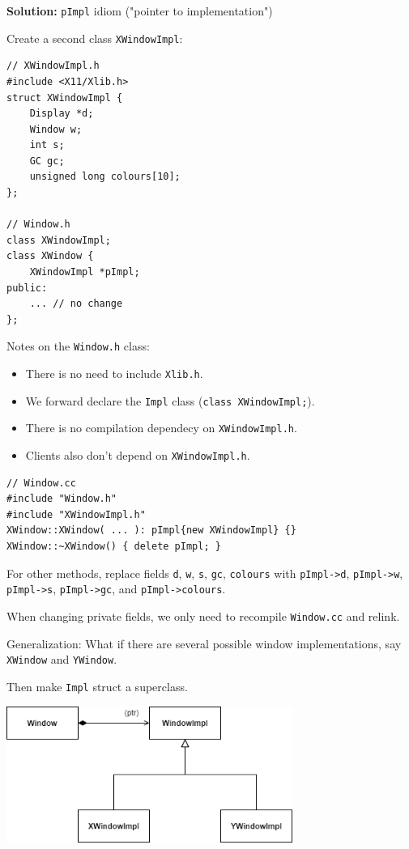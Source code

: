 \documentclass[11pt]{article}
\theoremstyle{definition}
\begin{document}
{\bf Solution:} {\tt pImpl} idiom ("pointer to implementation")

Create a second class {\tt XWindowImpl}:
\begin{lstlisting}
// XWindowImpl.h
#include <X11/Xlib.h>
struct XWindowImpl {
    Display *d;
    Window w;
    int s;
    GC gc;
    unsigned long colours[10];
};

// Window.h
class XWindowImpl;
class XWindow {
    XWindowImpl *pImpl;
public:
    ... // no change
};
\end{lstlisting}
\vspace{-0.25cm}
Notes on the {\tt Window.h} class:\vspace{-0.25cm}
\begin{itemize}
\item There is no need to include {\tt Xlib.h}.
\item We forward declare the {\tt Impl} class ({\tt class XWindowImpl;}).
\item There is no compilation dependecy on {\tt XWindowImpl.h}. 
\item Clients also don't depend on {\tt XWindowImpl.h}.
\end{itemize}
\begin{lstlisting}
// Window.cc
#include "Window.h"
#include "XWindowImpl.h"
XWindow::XWindow( ... ): pImpl{new XWindowImpl} {}
XWindow::~XWindow() { delete pImpl; }
\end{lstlisting}
\vspace{-0.25cm}
For other methods, replace fields {\tt d}, {\tt w}, {\tt s}, {\tt gc}, {\tt colours} with {\tt pImpl->d}, {\tt pImpl->w}, {\tt pImpl->s}, {\tt pImpl->gc}, and {\tt pImpl->colours}.

When changing private fields, we only need to recompile {\tt Window.cc} and relink.

Generalization: What if there are several possible window implementations, say {\tt XWindow} and {\tt YWindow}. 

Then make {\tt Impl} struct a superclass.
\begin{center}
\includegraphics[width=0.7\textwidth]{images/pimpl.png}
\end{center}
\end{document}
